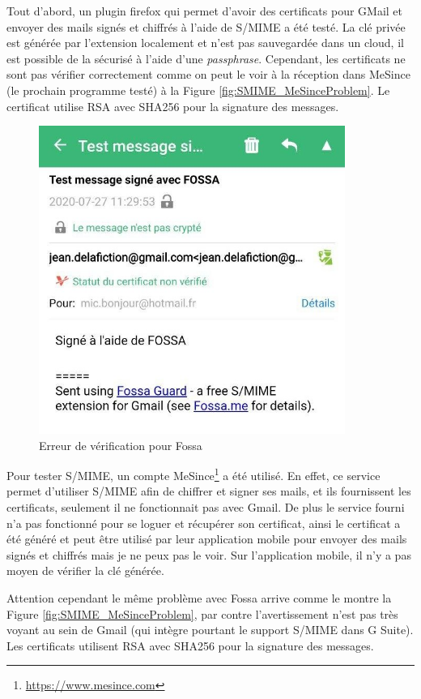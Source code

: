Tout d'abord, un plugin firefox qui permet d'avoir des certificats pour GMail et envoyer des mails signés et chiffrés à l'aide de S/MIME a été testé. La clé privée est générée par l'extension localement et n'est pas sauvegardée dans un cloud, il est possible de la sécurisé à l'aide d'une \textit{passphrase}. Cependant, les certificats ne sont pas vérifier correctement comme on peut le voir à la réception dans MeSince (le prochain programme testé) à la Figure \ref{fig:SMIME_MeSinceProblem}. Le certificat utilise RSA avec SHA256 pour la signature des messages.
\begin{figure}[h!]
	\includegraphics[width=10cm]{images/SMIME_FossaProblem.jpg}
	\centering
	\caption{Erreur de vérification pour Fossa}
	\label{fig:SMIME_FossaProblem}
\end{figure}

Pour tester S/MIME, un compte MeSince\footnote{\url{https://www.mesince.com}} a été utilisé. En effet, ce service permet d'utiliser S/MIME afin de chiffrer et signer ses mails, et ils fournissent les certificats, seulement il ne fonctionnait pas avec Gmail. De plus le service fourni n'a pas fonctionné pour se loguer et récupérer son certificat, ainsi le certificat a été généré et peut être utilisé par leur application mobile pour envoyer des mails signés et chiffrés mais je ne peux pas le voir. Sur l'application mobile, il n'y a pas moyen de vérifier la clé générée.

Attention cependant le même problème avec Fossa arrive comme le montre la Figure \ref{fig:SMIME_MeSinceProblem}, par contre l'avertissement n'est pas très voyant au sein de Gmail (qui intègre pourtant le support S/MIME dans G Suite). Les certificats utilisent RSA avec SHA256 pour la signature des messages.

